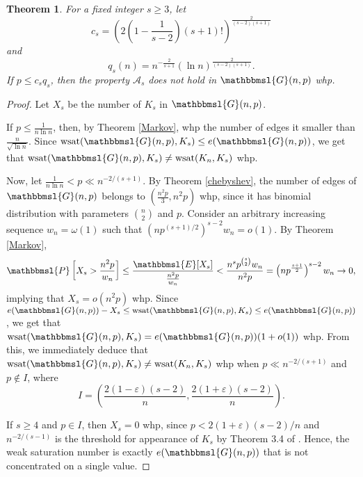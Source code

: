 \documentclass[hidelinks, 11pt]{article}
\theoremstyle{plain}
\newtheorem{theorem}{Theorem}[section]
\theoremstyle{definition}
\begin{document}
\begin{theorem}\label{lower-ii}
For a  fixed integer  $s\geq 3$,  let
$$c_s=\left(2\left(1-\frac{1}{s-2}\right)(s+1)!\right)^{\frac{2}{(s-2)(s+1)}}$$  and $$q_s(n)=n^{-\frac2{s+1}}(\ln n)^\frac{2}{(s-2)(s+1)}.$$
If $p\leq c_sq_s$, then   the property   $\mathcal{A}_s$ does not hold in $\mathbbmsl{G}(n, p)$ whp.
\end{theorem}


\begin{proof}

Let $X_s$ be the number of $K_s$  in $\mathbbmsl{G}(n,p)$. 

If $p\leq\frac{1}{n\ln n}$, then, by Theorem \ref{Markov}, whp the number of edges it smaller than $\frac{n}{\sqrt{\ln n}}$. Since $\mathrm{wsat}(\mathbbmsl{G}(n, p), K_s)\leq e(\mathbbmsl{G}(n, p))$, we get that $\mathrm{wsat}(\mathbbmsl{G}(n, p), K_s)\neq\mathrm{wsat}(K_n, K_s)$ whp.

Now, let $\frac{1}{n\ln n}<p\ll n^{-2/(s+1)}$. By Theorem \ref{chebyshev}, the number of edges of $\mathbbmsl{G}(n,p)$ belongs to $\left(\tfrac{n^2p}{3},n^2p\right)$  whp,   since it has binomial distribution with parameters ${n\choose 2}$ and $p$. Consider an arbitrary increasing sequence $w_n=\omega(1)$ such that $(np^{(s+1)/2})^{s-2}w_n=o(1)$. By Theorem \ref{Markov},
$$
\mathbbmsl{P}\left[X_s>\frac{n^2p}{w_n}\right]\leq\frac{\mathbbmsl{E}[X_s]}{\frac{n^2p}{w_n}}<\frac{n^sp^{s\choose 2}w_n}{n^2p}=\left(np^{\frac{s+1}{2}}\right)^{s-2}w_n\to 0,
$$
implying that $X_s=o(n^2p)$ whp. Since $e(\mathbbmsl{G}(n, p))-X_s\leq\mathrm{wsat}(\mathbbmsl{G}(n, p), K_s)\leq e(\mathbbmsl{G}(n, p))$, we get   that  $\mathrm{wsat}(\mathbbmsl{G}(n, p), K_s)=e(\mathbbmsl{G}(n, p))(1+o(1))$ whp. From this, we immediately deduce that   $\mathrm{wsat}(\mathbbmsl{G}(n, p), K_s)\neq\mathrm{wsat}(K_n, K_s)$ whp when  $p\ll n^{-2/(s+1)}$ and  $p\notin I$, where $$I=\left(\frac{2(1-\varepsilon)(s-2)}{n}, \frac{2(1+\varepsilon)(s-2)}{n}\right).$$

If  $s\geq4$ and $p\in I$, then  $X_s=0$ whp, since $p<2(1+\varepsilon)(s-2)/n$ and $n^{-2/(s-1)}$ is the threshold for appearance of $K_s$   by  Theorem 3.4 of   \cite{RG}. Hence,    the weak saturation number is exactly $e(\mathbbmsl{G}(n, p))$ that is not concentrated on a single value.


\end{proof}
\end{document}
